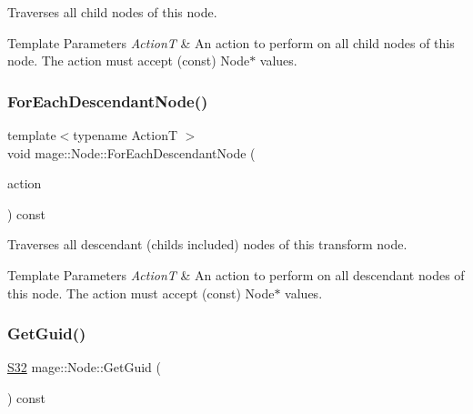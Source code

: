 Traverses all child nodes of this node.


\begin{DoxyTemplParams}{Template Parameters}
{\em ActionT} & An action to perform on all child nodes of this node. The action must accept ({\ttfamily const}) {\ttfamily Node$\ast$} values. \\
\hline
\end{DoxyTemplParams}
\hypertarget{classmage_1_1_node_a86668c371e1452204b52f2896cbb16fd}{}\label{classmage_1_1_node_a86668c371e1452204b52f2896cbb16fd} 
\subsubsection{\texorpdfstring{For\+Each\+Descendant\+Node()}{ForEachDescendantNode()}}
{\footnotesize\ttfamily template$<$typename ActionT $>$ \\
void mage\+::\+Node\+::\+For\+Each\+Descendant\+Node (\begin{DoxyParamCaption}\item[{ActionT}]{action }\end{DoxyParamCaption}) const}

Traverses all descendant (childs included) nodes of this transform node.


\begin{DoxyTemplParams}{Template Parameters}
{\em ActionT} & An action to perform on all descendant nodes of this node. The action must accept ({\ttfamily const}) {\ttfamily Node$\ast$} values. \\
\hline
\end{DoxyTemplParams}
\hypertarget{classmage_1_1_node_a41474294afb1064796ff8a75413734f3}{}\label{classmage_1_1_node_a41474294afb1064796ff8a75413734f3} 
\subsubsection{\texorpdfstring{Get\+Guid()}{GetGuid()}}
{\footnotesize\ttfamily \hyperlink{namespacemage_a642e05c5c83642b6946703615cdbf2da}{S32} mage\+::\+Node\+::\+Get\+Guid (\begin{DoxyParamCaption}{ }\end{DoxyParamCaption}) const\hspace{0.3cm}{\ttfamily [noexcept]}}


